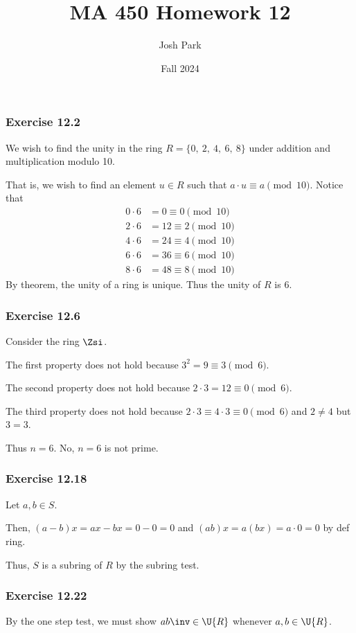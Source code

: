 \documentclass{article}
\author{Josh Park}
\date{\vspace*{-1em}Fall 2024}
\title{\vspace*{-2em}MA 450 Homework 12\vspace*{-1em}}
\begin{document}
\maketitle
\subsubsection*{Exercise 12.2}
We wish to find the unity in the ring \( R = \{0,\ 2,\ 4,\ 6,\ 8\} \) under addition and multiplication modulo 10.

That is, we wish to find an element \( u\in R \) such that \( a\cdot u \equiv a \pmod{10}\). Notice that
\begin{align*}
  0\cdot 6 &= 0 \equiv 0 \pmod{10} \\
  2\cdot 6 &= 12 \equiv 2 \pmod{10} \\
  4\cdot 6 &= 24 \equiv 4 \pmod{10} \\
  6\cdot 6 &= 36 \equiv 6 \pmod{10} \\
  8\cdot 6 &= 48 \equiv 8 \pmod{10}
\end{align*}
By theorem, the unity of a ring is unique. Thus the unity of \( R \) is \( 6 \).

\subsubsection*{Exercise 12.6}
Consider the ring \( \Zsi \).

The first property does not hold because \( 3^2 = 9 \equiv 3 \pmod{6} \).

The second property does not hold because \( 2\cdot 3 = 12 \equiv 0 \pmod{6} \).

The third property does not hold because \( 2\cdot 3 \equiv 4\cdot 3\equiv 0 \pmod{6} \) and \( 2\neq 4 \) but \( 3=3 \).

Thus \( n = 6 \). No, \( n = 6 \) is not prime.

\subsubsection*{Exercise 12.18}
Let \( a,b \in S \).

Then, \( (a-b)x = ax-bx = 0-0 = 0\) and \( (ab)x = a(bx) = a\cdot 0 = 0 \) by def ring.

Thus, \( S \) is a subring of \( R \) by the subring test.


\subsubsection*{Exercise 12.22}
By the one step test, we must show \( ab\inv \in \U{R} \) whenever \( a,b\in \U{R} \).
\end{document}
